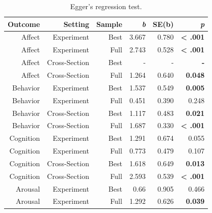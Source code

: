 \documentclass[man]{apa6}
\begin{document}
\begin{table}[htbp]
	\centering
	\caption{Egger's regression test.}
	\begin{tabular}{rrrrrr}
		\toprule
		Outcome & Setting & Sample & \textit{b} & SE(b) & \textit{p} \\
		\midrule
		Affect & Experiment & Best  & 3.667 & 0.780 & \textbf{< .001} \\
		Affect & Experiment & Full  & 2.743 & 0.528 & \textbf{< .001} \\
		Affect & Cross-Section & Best  & -     & -     & \textbf{-} \\
		Affect & Cross-Section & Full  & 1.264 & 0.640 & \textbf{0.048} \\
		Behavior & Experiment & Best  & 1.537 & 0.549 & \textbf{0.005} \\
		Behavior & Experiment & Full  & 0.451 & 0.390 & 0.248 \\
		Behavior & Cross-Section & Best  & 1.117 & 0.483 & \textbf{0.021} \\
		Behavior & Cross-Section & Full  & 1.687 & 0.330 & \textbf{< .001} \\
		Cognition & Experiment & Best  & 1.291 & 0.674 & 0.055 \\
		Cognition & Experiment & Full  & 0.773 & 0.479 & 0.107 \\
		Cognition & Cross-Section & Best  & 1.618 & 0.649 & \textbf{0.013} \\
		Cognition & Cross-Section & Full  & 2.593 & 0.539 & \textbf{< .001} \\
		Arousal & Experiment & Best  & 0.66  & 0.905 & 0.466 \\
		Arousal & Experiment & Full  & 1.292 & 0.626 & \textbf{0.039} \\
		\bottomrule
	\end{tabular}%
	\label{table:Egger}%
\end{table}
\end{document}
